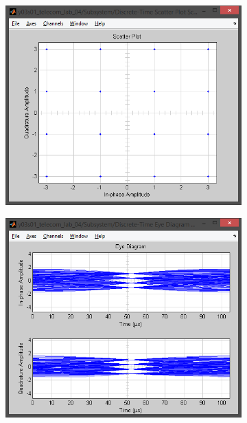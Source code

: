 \documentclass[
	a4paper,
	oneside,
	BCOR = 10mm,
	DIV = 12,
	12pt,
	headings = normal,
]{scrartcl}
\begin{document}
\begin{figure}[!htbp]
\begin{subfigure}{\textwidth / 3}
						\caption{}
						\label{subfig:rolloff-0p0-signal-trajectory-in}
					\end{subfigure}%
					\begin{subfigure}{\textwidth / 3}
						\centering
						\includegraphics[height = 7\baselineskip]{../01-solution/rolloff-0p0-scatter-plot-in.png}
						\caption{}
						\label{subfig:rolloff-0p0-scatter-plot-in}
					\end{subfigure}
					\begin{subfigure}{\textwidth / 3}
						\centering
						\includegraphics[height = 7\baselineskip]{../01-solution/rolloff-0p0-eye-diag-out.png}

\end{subfigure}
\end{figure}
\end{document}
